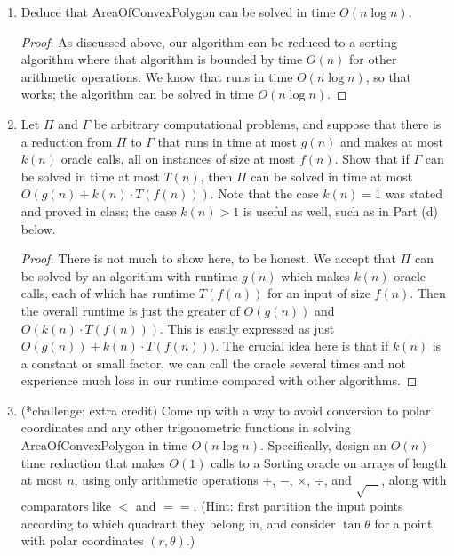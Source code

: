 \documentclass[11pt]{article}
\begin{document}
\begin{enumerate}
\begin{enumerate}
        \item Deduce that AreaOfConvexPolygon can be solved in time $O(n\log n)$.
        
\begin{proof}
As discussed above, our algorithm can be reduced to a sorting algorithm where that algorithm is bounded by time $O(n)$ for other arithmetic operations. We know that \MergeSort runs in time $O (n \log n)$, so that works; the algorithm can be solved in time $O(n \log n)$.
\end{proof}


        \item Let $\Pi$ and $\Gamma$ be arbitrary computational problems, and suppose that there is a reduction from $\Pi$ to $\Gamma$ that runs in time at most $g(n)$ and makes at most $k(n)$ oracle calls, all on instances of size at most $f(n)$.  Show that if $\Gamma$ can be solved in time at most $T(n)$, then $\Pi$ can be solved in time at most $O(g(n)+k(n)\cdot T(f(n)))$. Note that the case $k(n)=1$ was stated and proved in class; the case $k(n)>1$ is useful as well, such as in Part (d) below.
        
\begin{proof}
There is not much to show here, to be honest. We accept that $\Pi$ can be solved by an algorithm with runtime $g(n)$ which makes $k(n)$ oracle calls, each of which has runtime $T(f(n))$ for an input of size $f(n)$. Then the overall runtime is just the greater of $O(g(n))$ and $O(k(n) \cdot T(f(n)))$. This is easily expressed as just $O(g(n)) + k(n) \cdot T(f(n)))$. The crucial idea here is that if $k(n)$ is a constant or small factor, we can call the oracle several times and not experience much loss in our runtime compared with other algorithms.
\end{proof}
        
        \item (*challenge; extra credit) Come up with a way to avoid conversion to polar coordinates and any other trigonometric functions in solving AreaOfConvexPolygon in time $O(n\log n)$.  Specifically, design an $O(n)$-time reduction that makes $O(1)$ calls to a Sorting oracle on arrays of length at most $n$, using only arithmetic operations $+$, $-$, $\times$, $\div$, and $\sqrt{\hspace{1em}}$, along with comparators like $<$ and $==$.  (Hint: first partition the input points according to which quadrant they belong in, and consider $\tan\theta$ for a point with polar coordinates $(r,\theta)$.) 
        \end{enumerate}


\end{enumerate}
\end{document}
